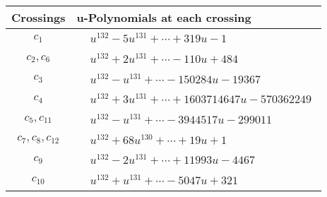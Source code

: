 \documentclass[1p]{elsarticle_modified}
\theoremstyle{definition}
\begin{document}
\begin{tabular}{m{50pt}|m{274pt}}
Crossings & \hspace{64pt}u-Polynomials at each crossing \\
\hline $$\begin{aligned}c_{1}\end{aligned}$$&$\begin{aligned}
&u^{132}-5 u^{131}+\cdots+319 u-1
\end{aligned}$\\
\hline $$\begin{aligned}c_{2},c_{6}\end{aligned}$$&$\begin{aligned}
&u^{132}+2 u^{131}+\cdots-110 u+484
\end{aligned}$\\
\hline $$\begin{aligned}c_{3}\end{aligned}$$&$\begin{aligned}
&u^{132}- u^{131}+\cdots-150284 u-19367
\end{aligned}$\\
\hline $$\begin{aligned}c_{4}\end{aligned}$$&$\begin{aligned}
&u^{132}+3 u^{131}+\cdots+1603714647 u-570362249
\end{aligned}$\\
\hline $$\begin{aligned}c_{5},c_{11}\end{aligned}$$&$\begin{aligned}
&u^{132}- u^{131}+\cdots-3944517 u-299011
\end{aligned}$\\
\hline $$\begin{aligned}c_{7},c_{8},c_{12}\end{aligned}$$&$\begin{aligned}
&u^{132}+68 u^{130}+\cdots+19 u+1
\end{aligned}$\\
\hline $$\begin{aligned}c_{9}\end{aligned}$$&$\begin{aligned}
&u^{132}-2 u^{131}+\cdots+11993 u-4467
\end{aligned}$\\
\hline $$\begin{aligned}c_{10}\end{aligned}$$&$\begin{aligned}
&u^{132}+u^{131}+\cdots-5047 u+321
\end{aligned}$\\
\hline
\end{tabular}\\~\\
\end{document}
